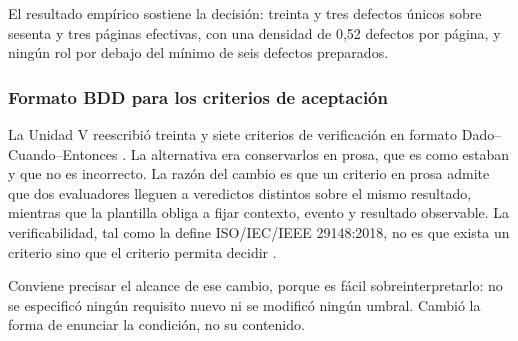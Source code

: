 El resultado empírico sostiene la decisión: treinta y tres defectos únicos sobre sesenta y tres
páginas efectivas, con una densidad de 0,52 defectos por página, y ningún rol por debajo del mínimo
de seis defectos preparados.

\subsubsection*{Formato BDD para los criterios de aceptación}

La Unidad V reescribió treinta y siete criterios de verificación en formato Dado--Cuando--Entonces
\cite{smart2014}. La alternativa era conservarlos en prosa, que es como estaban y que no es
incorrecto. La razón del cambio es que un criterio en prosa admite que dos evaluadores lleguen a
veredictos distintos sobre el mismo resultado, mientras que la plantilla obliga a fijar contexto,
evento y resultado observable. La verificabilidad, tal como la define ISO/IEC/IEEE 29148:2018, no es
que exista un criterio sino que el criterio permita decidir \cite{iso29148}.

Conviene precisar el alcance de ese cambio, porque es fácil sobreinterpretarlo: no se especificó
ningún requisito nuevo ni se modificó ningún umbral. Cambió la forma de enunciar la condición, no su
contenido.

